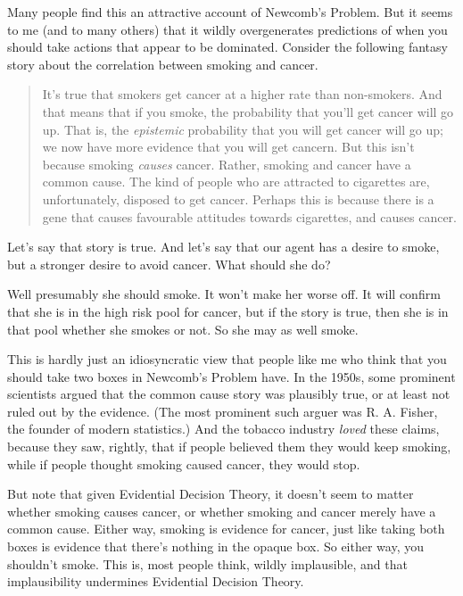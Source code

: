 Many people find this an attractive account of Newcomb's Problem. But it seems to me (and to many others) that it wildly overgenerates predictions of when you should take actions that appear to be dominated. Consider the following fantasy story about the correlation between smoking and cancer.

\begin{quote}
It's true that smokers get cancer at a higher rate than non-smokers. And that means that if you smoke, the probability that you'll get cancer will go up. That is, the \textit{epistemic} probability that you will get cancer will go up; we now have more evidence that you will get cancern. But this isn't because smoking \textit{causes} cancer. Rather, smoking and cancer have a common cause. The kind of people who are attracted to cigarettes are, unfortunately, disposed to get cancer. Perhaps this is because there is a gene that causes favourable attitudes towards cigarettes, and causes cancer.
\end{quote}

\noindent Let's say that story is true. And let's say that our agent has a desire to smoke, but a stronger desire to avoid cancer. What should she do?

Well presumably she should smoke. It won't make her worse off. It will confirm that she is in the high risk pool for cancer, but if the story is true, then she is in that pool whether she smokes or not. So she may as well smoke.

This is hardly just an idiosyncratic view that people like me who think that you should take two boxes in Newcomb's Problem have. In the 1950s, some prominent scientists argued that the common cause story was plausibly true, or at least not ruled out by the evidence. (The most prominent such arguer was R. A. Fisher, the founder of modern statistics.) And the tobacco industry \textit{loved} these claims, because they saw, rightly, that if people believed them they would keep smoking, while if people thought smoking caused cancer, they would stop.

But note that given Evidential Decision Theory, it doesn't seem to matter whether smoking causes cancer, or whether smoking and cancer merely have a common cause. Either way, smoking is evidence for cancer, just like taking both boxes is evidence that there's nothing in the opaque box. So either way, you shouldn't smoke. This is, most people think, wildly implausible, and that implausibility undermines Evidential Decision Theory.

